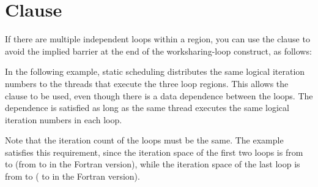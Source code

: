 \section{ Clause}
\label{sec:nowait}

If there are multiple independent loops within a  region, you 
can use the  clause to avoid the implied barrier at the end of
the worksharing-loop construct, as follows:



In the following example, static scheduling distributes the same logical iteration 
numbers to the threads that execute the three loop regions. This allows the  
clause to be used, even though there is a data dependence between the loops. The 
dependence is satisfied as long as the same thread executes the same logical iteration 
numbers in each loop.

Note that the iteration count of the loops must be the same. The example satisfies 
this requirement, since the iteration space of the first two loops is from  
to  (from  to  in the Fortran version), while the 
iteration space of the last loop is from  to  ( to 
 in the Fortran version).




